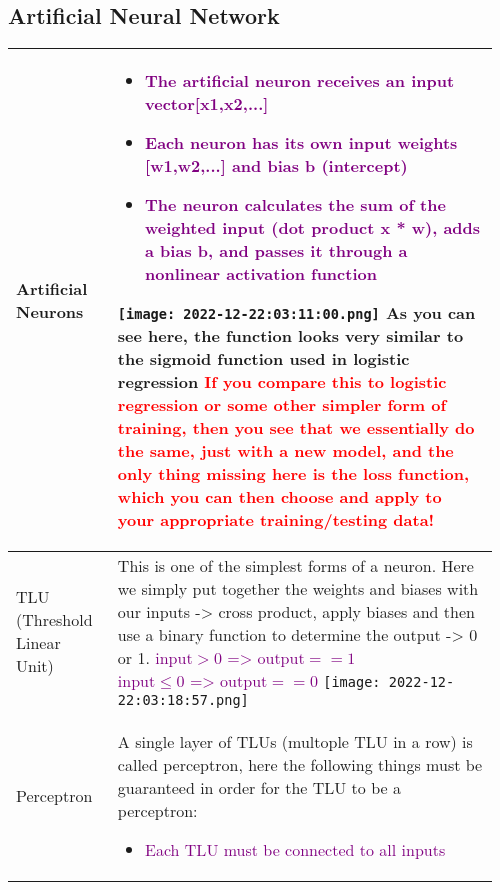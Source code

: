 \documentclass[main.tex,fontsize=8pt,paper=a4,paper=portrait,DIV=calc,]{scrartcl}
\begin{document}
\begin{table}[ht!]
\subsection{Artificial Neural Network}
\begin{tabular}{|m{0.2\linewidth}|m{0.755\linewidth}|}
\hline
Artificial Neurons &
\vspace{2mm}
\begin{itemize}
  \item \textcolor{purple}{The artificial neuron receives an input vector[x1,x2,...]}
  \item \textcolor{purple}{Each neuron has its own input weights [w1,w2,...] and \textbf{bias b} (intercept)}
\item \textcolor{purple}{The neuron calculates the sum of the weighted input (dot product x * w), adds a bias b, and passes it through a nonlinear \textbf{activation function}}
\end{itemize}
\texttt{[image: 2022-12-22:03:11:00.png]}\newline
As you can see here, the function looks very similar to the \textbf{sigmoid} function used in logistic regression\newline 
\textcolor{red}{If you compare this to logistic regression or some other simpler form of training, then you see that we essentially do the same, just with a new model, and the only thing missing here is the loss function, which you can then choose and apply to your appropriate training/testing data!}\\
\hline
TLU (Threshold Linear Unit) & 
This is one of the simplest forms of a neuron. Here we simply put together the weights and biases with our inputs -> cross product, apply biases and then use a binary function to determine the output -> 0 or 1. \newline
\textcolor{purple}{\( \text{input} > 0 \text{ => } \text{output} == 1 \)}\newline
\textcolor{purple}{\( \text{input} \leq 0 \text{ => } \text{output} == 0 \)}\newline
\texttt{[image: 2022-12-22:03:18:57.png]}
\\
\hline
Perceptron & 
A single layer of TLUs (multople TLU in a row) is called perceptron, here the following things must be guaranteed in order for the TLU to be a perceptron:\newline
\begin{itemize}
\item \textcolor{purple}{Each TLU must be connected to all inputs}

\end{itemize}
\end{tabular}
\end{table}
\end{document}
